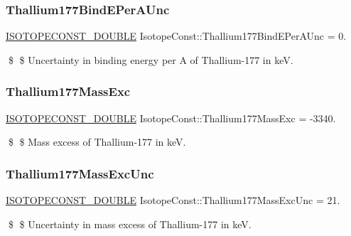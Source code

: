 \subsubsection{\texorpdfstring{Thallium177\+Bind\+E\+Per\+A\+Unc}{Thallium177BindEPerAUnc}}
{\footnotesize\ttfamily \mbox{\hyperlink{group___isotope_const-_macros_ga8f45a7272ce02c0b4c65c44636ed719a}{I\+S\+O\+T\+O\+P\+E\+C\+O\+N\+S\+T\+\_\+\+D\+O\+U\+B\+LE}} Isotope\+Const\+::\+Thallium177\+Bind\+E\+Per\+A\+Unc = 0.}

\$ \$ Uncertainty in binding energy per A of Thallium-\/177 in keV. \mbox{\label{group___isotope_const-_thallium-_tl177_ga777d2a0068c2c8c2fe91bc64809e5f66}} 
\subsubsection{\texorpdfstring{Thallium177\+Mass\+Exc}{Thallium177MassExc}}
{\footnotesize\ttfamily \mbox{\hyperlink{group___isotope_const-_macros_ga8f45a7272ce02c0b4c65c44636ed719a}{I\+S\+O\+T\+O\+P\+E\+C\+O\+N\+S\+T\+\_\+\+D\+O\+U\+B\+LE}} Isotope\+Const\+::\+Thallium177\+Mass\+Exc = -\/3340.}

\$ \$ Mass excess of Thallium-\/177 in keV. \mbox{\label{group___isotope_const-_thallium-_tl177_ga74a48c0641a5f7e91558cdc0b3861608}} 
\subsubsection{\texorpdfstring{Thallium177\+Mass\+Exc\+Unc}{Thallium177MassExcUnc}}
{\footnotesize\ttfamily \mbox{\hyperlink{group___isotope_const-_macros_ga8f45a7272ce02c0b4c65c44636ed719a}{I\+S\+O\+T\+O\+P\+E\+C\+O\+N\+S\+T\+\_\+\+D\+O\+U\+B\+LE}} Isotope\+Const\+::\+Thallium177\+Mass\+Exc\+Unc = 21.}

\$ \$ Uncertainty in mass excess of Thallium-\/177 in keV. \mbox{\label{group___isotope_const-_thallium-_tl177_ga590b0b118f032789dd72c40244a7cfbc}} 

